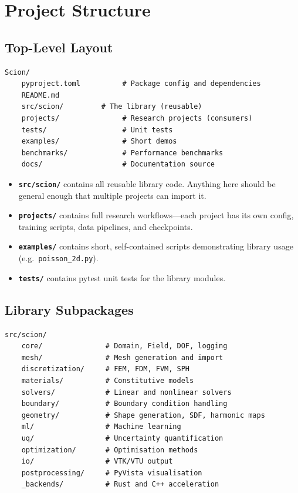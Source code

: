 \documentclass[11pt,a4paper]{report}
\begin{document}
\chapter{Project Structure}

\section{Top-Level Layout}

\begin{lstlisting}[style=bash,numbers=none]
Scion/
    pyproject.toml          # Package config and dependencies
    README.md
    src/scion/         # The library (reusable)
    projects/               # Research projects (consumers)
    tests/                  # Unit tests
    examples/               # Short demos
    benchmarks/             # Performance benchmarks
    docs/                   # Documentation source
\end{lstlisting}

\begin{itemize}[leftmargin=2em]
    \item \textbf{\texttt{src/scion/}} contains all reusable library code. Anything here should be general enough that multiple projects can import it.
    \item \textbf{\texttt{projects/}} contains full research workflows---each project has its own config, training scripts, data pipelines, and checkpoints.
    \item \textbf{\texttt{examples/}} contains short, self-contained scripts demonstrating library usage (e.g.\ \texttt{poisson\_2d.py}).
    \item \textbf{\texttt{tests/}} contains pytest unit tests for the library modules.
\end{itemize}

\section{Library Subpackages}

\begin{lstlisting}[style=bash,numbers=none]
src/scion/
    core/               # Domain, Field, DOF, logging
    mesh/               # Mesh generation and import
    discretization/     # FEM, FDM, FVM, SPH
    materials/          # Constitutive models
    solvers/            # Linear and nonlinear solvers
    boundary/           # Boundary condition handling
    geometry/           # Shape generation, SDF, harmonic maps
    ml/                 # Machine learning
    uq/                 # Uncertainty quantification
    optimization/       # Optimisation methods
    io/                 # VTK/VTU output
    postprocessing/     # PyVista visualisation
    _backends/          # Rust and C++ acceleration
\end{lstlisting}
\end{document}
